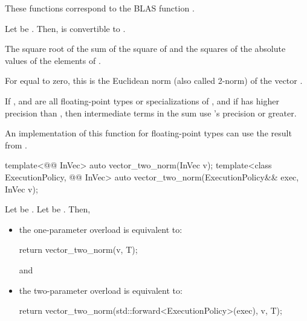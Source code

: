 \begin{itemdescr}
\pnum
\begin{note}
These functions correspond to the BLAS function \supercite{blas1}.
\end{note}

\pnum
\mandates
Let  be
.
Then,  is convertible to .

\pnum
\returns
The square root of the sum of the square of  and the squares of the absolute values of the elements of .
\begin{note}
For  equal to zero, this is the Euclidean norm
(also called 2-norm) of the vector .
\end{note}

\pnum
\remarks
If , and 
are all floating-point types or specializations of ,
and if  has higher precision
than ,
then intermediate terms in the sum use 's precision or greater.
\begin{note}
An implementation of this function for floating-point types 
can use the  result from
.
\end{note}
\end{itemdescr}

%
\begin{itemdecl}
template<@@ InVec>
  auto vector_two_norm(InVec v);
template<class ExecutionPolicy, @@ InVec>
  auto vector_two_norm(ExecutionPolicy&& exec, InVec v);
\end{itemdecl}

\begin{itemdescr}
\pnum
\effects
Let  be
.
Let  be .
Then,
\begin{itemize}
\item
the one-parameter overload is equivalent to:
\begin{codeblock}
return vector_two_norm(v, T{});
\end{codeblock}
and
\item
the two-parameter overload is equivalent to:
\begin{codeblock}
return vector_two_norm(std::forward<ExecutionPolicy>(exec), v, T{});
\end{codeblock}
\end{itemize}
\end{itemdescr}


